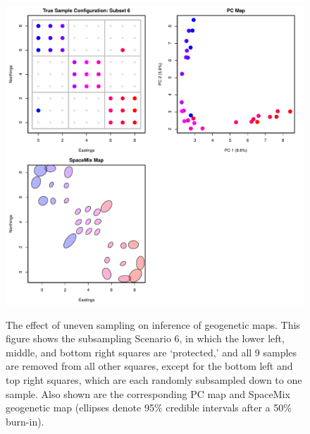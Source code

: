 \documentclass[10pt,letterpaper]{article}
\begin{document}
\begin{figure}
\centering
	{\includegraphics[width=\textwidth]{../figs/sims/grid_subsamp_diag.pdf}}
	\caption{The effect of uneven sampling on inference of geogenetic maps.  
			This figure shows the subsampling Scenario 6, 
			in which the lower left, middle, and bottom right squares are `protected,'
			and all 9 samples are removed from all other squares, 
			except for the bottom left and top right squares, which are each 
			randomly subsampled down to one sample.
			Also shown are the corresponding PC map and 
			SpaceMix geogenetic map 
			(ellipses denote 95\% credible intervals after a 50\% burn-in).}\label{sfig:uneven_sampling_grid_subsamp_diag}
\end{figure}
\end{document}
